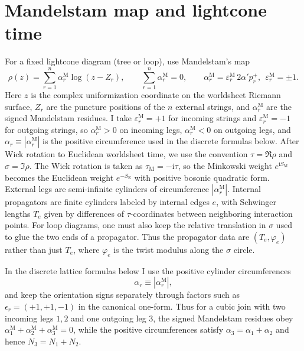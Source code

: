 \documentclass[11pt]{article}
\numberwithin{equation}{section}
\newcommand{\al}{\alpha'}
\newcommand{\ii}{\mathrm{i}}
\begin{document}
\section{Mandelstam map and lightcone time}
For a fixed lightcone diagram (tree or loop), use Mandelstam's map
\begin{equation}
\label{eq:s4-001}
\rho(z)=\sum_{r=1}^{n}\alpha_r^{\mathrm{M}} \log(z-Z_r),\qquad \sum_{r=1}^n \alpha_r^{\mathrm{M}}=0,\qquad \alpha_r^{\mathrm{M}}=\varepsilon_r^{\mathrm{M}}\,2\al p_r^+,\ \ \varepsilon_r^{\mathrm{M}}=\pm 1.
\end{equation}
Here $z$ is the complex uniformization coordinate on the worldsheet Riemann surface, $Z_r$ are the puncture positions of the $n$ external strings, and $\alpha_r^{\mathrm M}$ are the signed Mandelstam residues. I take $\varepsilon_r^{\mathrm M}=+1$ for incoming strings and $\varepsilon_r^{\mathrm M}=-1$ for outgoing strings, so $\alpha_r^{\mathrm M}>0$ on incoming legs, $\alpha_r^{\mathrm M}<0$ on outgoing legs, and $\alpha_r\equiv |\alpha_r^{\mathrm M}|$ is the positive circumference used in the discrete formulas below.
After Wick rotation to Euclidean worldsheet time, we use the convention $\tau=\Re \rho$ and $\sigma=\Im \rho$.
The Wick rotation is taken as $\tau_{\mathrm{M}}=-\ii\tau$, so the Minkowski weight $e^{\ii S_{\mathrm{M}}}$ becomes the Euclidean weight $e^{-S_{\mathrm{E}}}$ with positive bosonic quadratic form.
External legs are semi-infinite cylinders of circumference $|\alpha_r^{\mathrm{M}}|$.
Internal propagators are finite cylinders labeled by internal edges $e$, with Schwinger lengths $T_e$ given by differences of $\tau$-coordinates between neighboring interaction points. For loop diagrams, one must also keep the relative translation in $\sigma$ used to glue the two ends of a propagator. Thus the propagator data are $(T_e,\varphi_e)$ rather than just $T_e$, where $\varphi_e$ is the twist modulus along the $\sigma$ circle.

In the discrete lattice formulas below I use the positive cylinder circumferences
\begin{equation}
\label{eq:s4-002}
\alpha_r \equiv |\alpha_r^{\mathrm{M}}|,
\end{equation}
and keep the orientation signs separately through factors such as $\epsilon_r=(+1,+1,-1)$ in the canonical one-form. Thus for a cubic join with two incoming legs $1,2$ and one outgoing leg $3$, the signed Mandelstam residues obey $\alpha_1^{\mathrm{M}}+\alpha_2^{\mathrm{M}}+\alpha_3^{\mathrm{M}}=0$, while the positive circumferences satisfy $\alpha_3=\alpha_1+\alpha_2$ and hence $N_3=N_1+N_2$.
\end{document}
